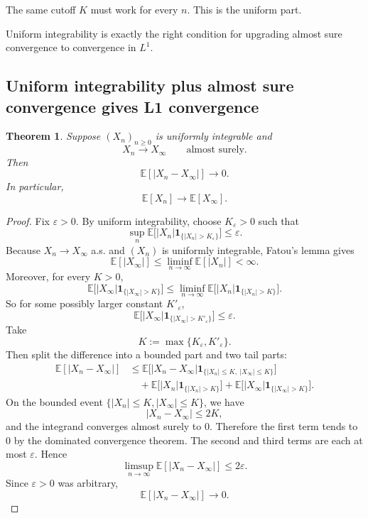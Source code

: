 \documentclass[11pt]{article}
\newtheorem{theorem}{Theorem}[section]
\theoremstyle{definition}
\begin{document}
The same cutoff \(K\) must work for every \(n\). This is the uniform part.

Uniform integrability is exactly the right condition for upgrading almost sure convergence to convergence in \(L^1\).

\subsection{Uniform integrability plus almost sure convergence gives L1 convergence}

\begin{theorem}
Suppose \((X_n)_{n\ge 0}\) is uniformly integrable and
\[
X_n \to X_\infty
\qquad \text{almost surely.}
\]
Then
\[
\mathbb E[|X_n-X_\infty|] \to 0.
\]
In particular,
\[
\mathbb E[X_n] \to \mathbb E[X_\infty].
\]
\end{theorem}

\begin{proof}
Fix \(\varepsilon>0\). By uniform integrability, choose \(K_\varepsilon>0\) such that
\[
\sup_n \mathbb E\bigl[|X_n|\mathbf 1_{\{|X_n|>K_\varepsilon\}}\bigr] \le \varepsilon.
\]
Because \(X_n\to X_\infty\) a.s. and \((X_n)\) is uniformly integrable, Fatou's lemma gives
\[
\mathbb E[|X_\infty|]
\le
\liminf_{n\to\infty} \mathbb E[|X_n|]
< \infty.
\]
Moreover, for every \(K>0\),
\[
\mathbb E\bigl[|X_\infty|\mathbf 1_{\{|X_\infty|>K\}}\bigr]
\le
\liminf_{n\to\infty}
\mathbb E\bigl[|X_n|\mathbf 1_{\{|X_n|>K\}}\bigr].
\]
So for some possibly larger constant \(K'_\varepsilon\),
\[
\mathbb E\bigl[|X_\infty|\mathbf 1_{\{|X_\infty|>K'_\varepsilon\}}\bigr] \le \varepsilon.
\]
Take
\[
K := \max\{K_\varepsilon,K'_\varepsilon\}.
\]
Then split the difference into a bounded part and two tail parts:
\begin{align*}
\mathbb E[|X_n-X_\infty|]
&\le
\mathbb E\bigl[|X_n-X_\infty|\mathbf 1_{\{|X_n|\le K,\ |X_\infty|\le K\}}\bigr] \\
&\quad+
\mathbb E\bigl[|X_n|\mathbf 1_{\{|X_n|>K\}}\bigr]
+
\mathbb E\bigl[|X_\infty|\mathbf 1_{\{|X_\infty|>K\}}\bigr].
\end{align*}
On the bounded event \(\{|X_n|\le K, |X_\infty|\le K\}\), we have
\[
|X_n-X_\infty| \le 2K,
\]
and the integrand converges almost surely to \(0\). Therefore the first term tends to \(0\) by the dominated convergence theorem. The second and third terms are each at most \(\varepsilon\). Hence
\[
\limsup_{n\to\infty}\mathbb E[|X_n-X_\infty|] \le 2\varepsilon.
\]
Since \(\varepsilon>0\) was arbitrary,
\[
\mathbb E[|X_n-X_\infty|] \to 0.
\]
\end{proof}
\end{document}
